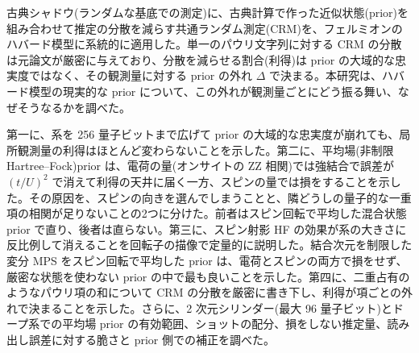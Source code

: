 古典シャドウ(ランダムな基底での測定)に、古典計算で作った近似状態(prior)を組み合わせて推定の分散を減らす共通ランダム測定(CRM)\cite{vermersch2024}を、フェルミオンのハバード模型に系統的に適用した。単一のパウリ文字列に対する CRM の分散は元論文が厳密に与えており、分散を減らせる割合(利得)は prior の大域的な忠実度ではなく、その観測量に対する prior の外れ $\Delta$ で決まる。本研究は、ハバード模型の現実的な prior について、この外れが観測量ごとにどう振る舞い、なぜそうなるかを調べた。

第一に、系を 256 量子ビットまで広げて prior の大域的な忠実度が崩れても、局所観測量の利得はほとんど変わらないことを示した。第二に、平均場(非制限 Hartree--Fock)prior は、電荷の量(オンサイトの ZZ 相関)では強結合で誤差が $(t/U)^2$ で消えて利得の天井に届く一方、スピンの量では損をすることを示した。その原因を、スピンの向きを選んでしまうことと、隣どうしの量子的な一重項の相関が足りないことの2つに分けた。前者はスピン回転で平均した混合状態 prior で直り、後者は直らない。第三に、スピン射影 HF の効果が系の大きさに反比例して消えることを回転子の描像で定量的に説明した。結合次元を制限した変分 MPS をスピン回転で平均した prior は、電荷とスピンの両方で損をせず、厳密な状態を使わない prior の中で最も良いことを示した。第四に、二重占有のようなパウリ項の和について CRM の分散を厳密に書き下し、利得が項ごとの外れで決まることを示した。さらに、2 次元シリンダー(最大 96 量子ビット)とドープ系での平均場 prior の有効範囲、ショットの配分、損をしない推定量、読み出し誤差に対する脆さと prior 側での補正を調べた。
